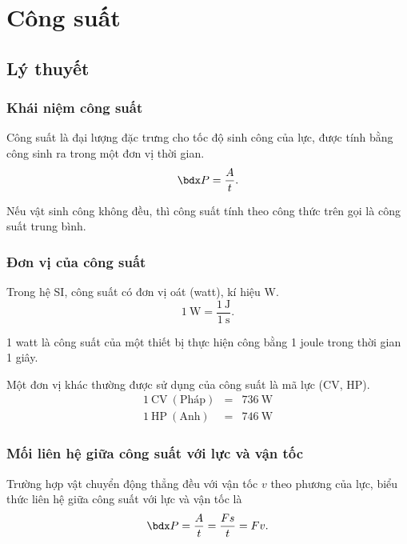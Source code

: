\let\lesson\undefined
\newcommand{\lesson}{\phantomlesson{Bài 16: Công suất}}
\chapter[Công suất]{Công suất}
\setcounter{section}{0}
\section{Lý thuyết}
\subsection{Khái niệm công suất}
Công suất là đại lượng đặc trưng cho tốc độ sinh công của lực, được tính bằng công sinh ra trong một đơn vị thời gian.
\begin{equation*}
	\calP=\dfrac{A}{t}.
\end{equation*}

Nếu vật sinh công không đều, thì công suất tính theo công thức trên gọi là công suất trung bình. 
\subsection{Đơn vị của công suất}

Trong hệ SI, công suất có đơn vị oát (watt), kí hiệu W.
\begin{equation*}
	1\ \text{W}=\dfrac{1\ \text{J}}{1\ \text{s}}.
\end{equation*}

1 watt là công suất của một thiết bị thực hiện công bằng 1 joule  trong thời gian 1 giây.

Một đơn vị khác thường được sử dụng của công suất là mã lực (CV, HP).
\begin{eqnarray*}
	1\ \text{CV}\ (\text{Pháp}) &=& 736\ \text{W}\\
	1\ \text{HP}\ (\text{Anh}) &=& 746\ \text{W}		
\end{eqnarray*}

\subsection{Mối liên hệ giữa công suất với lực và vận tốc}
Trường hợp vật chuyển động thẳng đều với vận tốc $v$ theo phương của lực, biểu thức liên hệ giữa công suất với lực và vận tốc là
$$\calP = \dfrac{A}{t} = \dfrac{Fs}{t}= Fv.$$

